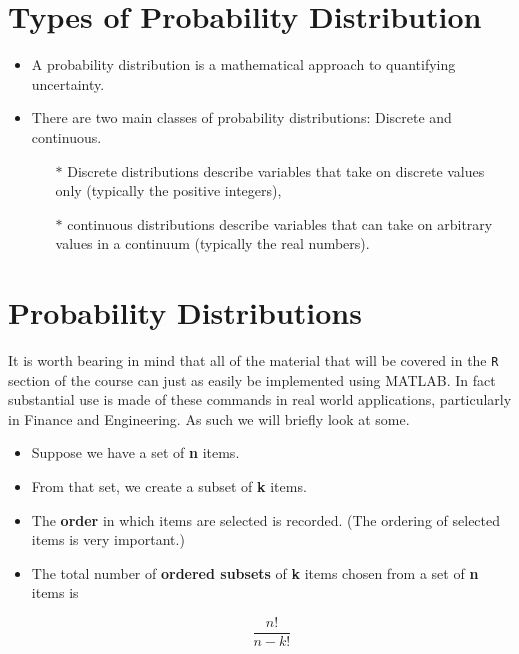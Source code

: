 \documentclass[a4paper,12pt]{article}
\begin{document}
\section{Types of Probability Distribution}
\begin{itemize}
\item A probability distribution is a mathematical approach to quantifying uncertainty.

\item There are two main classes of probability distributions: Discrete and continuous. 

\begin{itemize}
\item[$\ast$] Discrete distributions describe variables that take on discrete values only (typically the positive integers), 
\item[$\ast$] continuous distributions describe variables that can take on arbitrary values in a continuum (typically the real numbers).
\end{itemize}
\end{itemize}

\section{Probability Distributions}

It is worth bearing in mind that all of the material that will be covered in the \texttt{R} section of the course can just as easily be implemented using MATLAB. In fact substantial use is made of these commands in real world applications, particularly in Finance and Engineering.
As such we will briefly look at some.





\begin{itemize}

\item Suppose we have a set of \textbf{n} items.
\item From that set, we create a subset of \textbf{k} items.
\item The \textbf{order} in which items are selected is recorded. (The ordering of selected items is very important.) 
\item The total number of \textbf{ordered subsets} of \textbf{k} items chosen from a set of \textbf{n} items is

\[\frac{n!}{n-k!}\]
\end{itemize}
\end{document}
